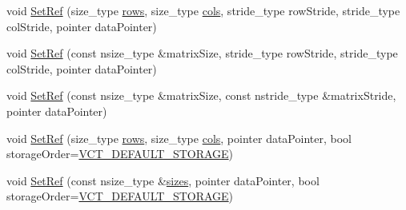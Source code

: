 {\bf }\par
\begin{DoxyCompactItemize}
\item 
void \hyperlink{classvct_dynamic_matrix_ref_a99a2f5a8b4b5f45ce180d5075dd70311}{Set\+Ref} (size\+\_\+type \hyperlink{classvct_dynamic_const_matrix_base_a5eac13be2207ebeb8766cde379d73438}{rows}, size\+\_\+type \hyperlink{classvct_dynamic_const_matrix_base_aa6c51d41a100da49a7e7ac7edb20ecd9}{cols}, stride\+\_\+type row\+Stride, stride\+\_\+type col\+Stride, pointer data\+Pointer)
\item 
void \hyperlink{classvct_dynamic_matrix_ref_a256d14b9ff9aaf1848009129b72630a5}{Set\+Ref} (const nsize\+\_\+type \&matrix\+Size, stride\+\_\+type row\+Stride, stride\+\_\+type col\+Stride, pointer data\+Pointer)
\item 
void \hyperlink{classvct_dynamic_matrix_ref_af0308670e886de7c56ca35d3044dbf58}{Set\+Ref} (const nsize\+\_\+type \&matrix\+Size, const nstride\+\_\+type \&matrix\+Stride, pointer data\+Pointer)
\end{DoxyCompactItemize}

{\bf }\par
\begin{DoxyCompactItemize}
\item 
void \hyperlink{classvct_dynamic_matrix_ref_ace79e39eebb9328e37e48273a11a7d7a}{Set\+Ref} (size\+\_\+type \hyperlink{classvct_dynamic_const_matrix_base_a5eac13be2207ebeb8766cde379d73438}{rows}, size\+\_\+type \hyperlink{classvct_dynamic_const_matrix_base_aa6c51d41a100da49a7e7ac7edb20ecd9}{cols}, pointer data\+Pointer, bool storage\+Order=\hyperlink{vct_forward_declarations_8h_aacdb3b0140beef8a3c2025b808b74a73}{V\+C\+T\+\_\+\+D\+E\+F\+A\+U\+L\+T\+\_\+\+S\+T\+O\+R\+A\+G\+E})
\item 
void \hyperlink{classvct_dynamic_matrix_ref_aa6dfd65e23f0965221b971941944ca03}{Set\+Ref} (const nsize\+\_\+type \&\hyperlink{classvct_dynamic_const_matrix_base_ab8946f5d9d05321fcadf07f65dc314ce}{sizes}, pointer data\+Pointer, bool storage\+Order=\hyperlink{vct_forward_declarations_8h_aacdb3b0140beef8a3c2025b808b74a73}{V\+C\+T\+\_\+\+D\+E\+F\+A\+U\+L\+T\+\_\+\+S\+T\+O\+R\+A\+G\+E})
\end{DoxyCompactItemize}

